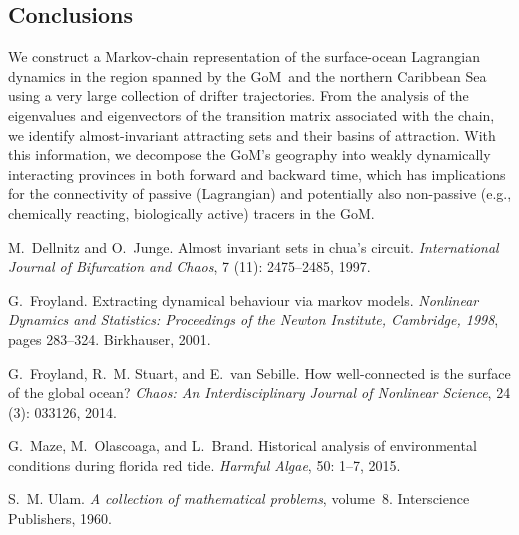 \documentclass[final]{beamer}
\newcommand{\gom}{GoM}
\begin{document}
\begin{frame}[t]
\begin{multicols}{3}
\section{Conclusions}
We construct a Markov-chain representation of the surface-ocean Lagrangian
dynamics in the region spanned by the \gom\ and the northern Caribbean Sea
using a very large collection of drifter trajectories. From the analysis of the
eigenvalues and eigenvectors of the transition matrix associated with the
chain, we identify almost-invariant attracting sets and their basins of
attraction. With this information, we decompose the GoM's geography into weakly
dynamically interacting provinces in both forward and backward time, which has
implications for the connectivity of passive (Lagrangian) and potentially also
non-passive (e.g., chemically reacting, biologically active) tracers in the
\gom.


\begingroup
\renewcommand{\section}[2]{}%
\begin{thebibliography}{5}

M.~Dellnitz and O.~Junge.
\newblock Almost invariant sets in chua's circuit.
\newblock \emph{International Journal of Bifurcation and Chaos}, 7
  (11): 2475--2485, 1997.

G.~Froyland.
\newblock Extracting dynamical behaviour via markov models.
\newblock \emph{Nonlinear Dynamics and Statistics:
  Proceedings of the Newton Institute, Cambridge, 1998}, pages 283--324.
  Birkhauser, 2001.

G.~Froyland, R.~M. Stuart, and E.~van Sebille.
\newblock How well-connected is the surface of the global ocean?
\newblock \emph{Chaos: An Interdisciplinary Journal of Nonlinear Science},
  24 (3): 033126, 2014.

G.~Maze, M.~Olascoaga, and L.~Brand.
\newblock Historical analysis of environmental conditions during florida red
  tide.
\newblock \emph{Harmful Algae}, 50: 1--7, 2015.

S.~M. Ulam.
\newblock \emph{A collection of mathematical problems}, volume~8.
\newblock Interscience Publishers, 1960.
\end{thebibliography}
\endgroup
\vspace{0.5cm}
\end{multicols}
\end{frame}
\end{document}
